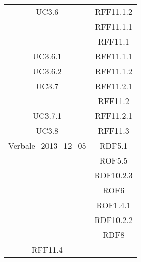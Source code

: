 \begin{longtable}{|c|c|}
\midrule
UC3.6
& RFF11.1.2\\
& RFF11.1.1\\
& RFF11.1\\

\midrule
UC3.6.1
& RFF11.1.1\\

\midrule
UC3.6.2
& RFF11.1.2\\

\midrule
UC3.7
& RFF11.2.1\\
& RFF11.2\\

\midrule
UC3.7.1
& RFF11.2.1\\

\midrule
UC3.8
& RFF11.3\\

\midrule
Verbale\_2013\_12\_05
& RDF5.1\\
& ROF5.5\\
& RDF10.2.3\\
& ROF6\\
& ROF1.4.1\\
& RDF10.2.2\\
& RDF8\\

\midrule
RFF11.4
& \\

\end{longtable}


